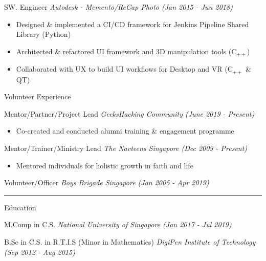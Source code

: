 \documentclass[letterpaper,11pt]{article}
\newcommand{\cvtitle}[1]{\Large\raggedright \textcolor{section_color}{#1}\\}
\newcommand{\cvhead}[1]{\large\raggedright \textcolor{subsection_color}{#1}\\}
\newcommand{\cvlist}[1]{\vspace{-12pt}\small \textcolor{item_color}{\begin{itemize}#1\end{itemize}}}
\newcommand{\cvli}[1]{\vspace{-4pt} \item{#1}}
\newcommand{\cvline}[0]{\noindent\rule{19cm}{0.4pt}}
\newcommand{\qualifier}[1]{\hfill \textsl{\footnotesize #1}}
\begin{document}
\cvhead{SW. Engineer \qualifier{Autodesk - Memento/ReCap Photo (Jan 2015 - Jun 2018)}}
\cvlist{
    \cvli{Designed \& implemented a CI/CD framework for Jenkins Pipeline Shared Library (Python)}
    \cvli{Architected \& refactored UI framework and 3D manipulation tools (C$_{++}$)}
    \cvli{Collaborated with UX to build UI workflows for Desktop and VR (C$_{++}$ \& QT)}
}

\cvtitle{Volunteer Experience}

\cvhead{Mentor/Partner/Project Lead \qualifier{GeeksHacking Community (June 2019 - Present)}}
\cvlist{
    \cvli{Co-created and conducted alumni training \& engagement programme}
}

\cvhead{Mentor/Trainer/Ministry Lead \qualifier{The Navteens Singapore (Dec 2009 - Present)}}
\cvlist{
    \cvli{Mentored individuals for holistic growth in faith and life}
}

\cvhead{Volunteer/Officer \qualifier{Boys Brigade Singapore (Jan 2005 - Apr 2019)}}

\cvline

\cvtitle{Education}

\cvhead{M.Comp in C.S. \qualifier{National University of Singapore (Jan 2017 - Jul 2019)}}

\cvhead{B.Sc in C.S. in R.T.I.S (Minor in Mathematics) \qualifier{DigiPen Institute of Technology (Sep 2012 - Aug 2015)}}
\end{document}
